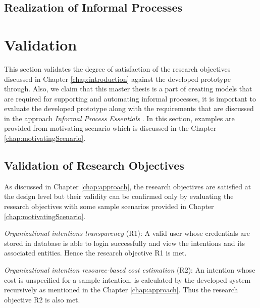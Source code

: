 	\subsection{Realization of Informal Processes}
	
	
	
\section{Validation}
\label{sec:validation}
This section validates the degree of satisfaction of the research objectives discussed in Chapter \ref{chap:introduction} against the developed prototype through. Also, we claim that this master thesis is a part of creating models that are required for supporting and automating informal processes, it is important to evaluate the developed prototype along with the requirements that are discussed in the approach \textit{Informal Process Essentials} \cite{Sungur2014a}. In this section, examples are provided from motivating scenario which is discussed in the Chapter \ref{chap:motivatingScenario}.
	
	
\subsection{Validation of Research Objectives}
\label{subsec:validationofrequirements}
As discussed in Chapter \ref{chap:approach}, the research objectives are satisfied at the design level but their validity can be confirmed only by evaluating the research objectives with some sample scenarios provided in Chapter \ref{chap:motivatingScenario}.   

\textit{Organizational intentions transparency} (R1): A valid user whose credentials are stored in database is able to login successfully and view the intentions and its associated entities. Hence the research objective R1 is met.

\textit{Organizational intention resource-based cost estimation} (R2): An intention whose cost is unspecified for a sample intention, is calculated by the developed system recursively as mentioned in the Chapter \ref{chap:approach}. Thus the research objective R2 is also met.

